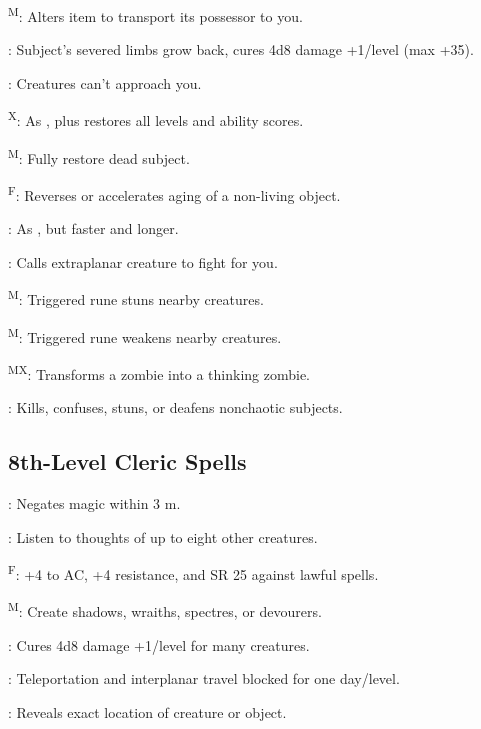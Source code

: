 \textsuperscript{M}: Alters item to transport its possessor to you.

: Subject's severed limbs grow back, cures 4d8 damage +1/level (max +35).

: Creatures can't approach you.

\textsuperscript{X}: As , plus restores all levels and ability scores.

\textsuperscript{M}: Fully restore dead subject.

\textsuperscript{F}: Reverses or accelerates aging of a non-living object. %

: As , but faster and longer.

: Calls extraplanar creature to fight for you.

\textsuperscript{M}: Triggered rune stuns nearby creatures.

\textsuperscript{M}: Triggered rune weakens nearby creatures.

\textsuperscript{MX}: Transforms a zombie into a thinking zombie. %

: Kills, confuses, stuns, or deafens nonchaotic subjects.



\subsection{8th-Level Cleric Spells}

: Negates magic within 3 m.

: Listen to thoughts of up to eight other creatures.

\textsuperscript{F}: +4 to AC, +4 resistance, and SR 25 against lawful spells.

\textsuperscript{M}: Create shadows, wraiths, spectres, or devourers.

: Cures 4d8 damage +1/level for many creatures.

: Teleportation and interplanar travel blocked for one day/level.

: Reveals exact location of creature or object.

